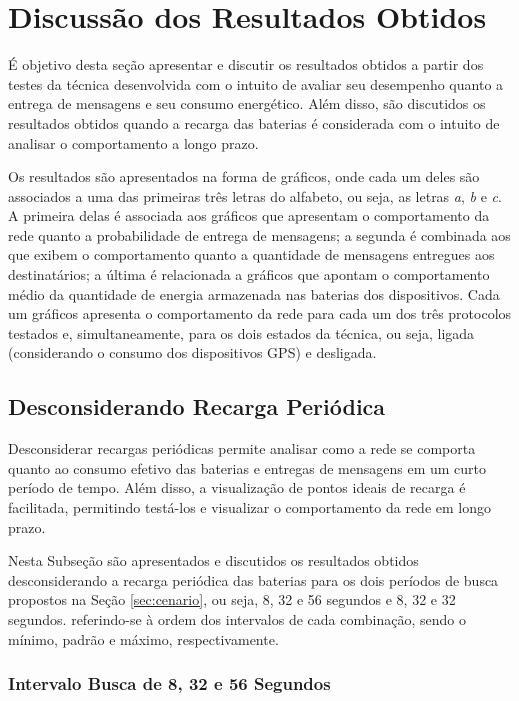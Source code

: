 \section{Discussão dos Resultados Obtidos}

É objetivo desta seção apresentar e discutir os resultados obtidos a partir dos testes da técnica desenvolvida com o intuito de avaliar seu desempenho quanto a entrega de mensagens e seu consumo energético. Além disso, são discutidos os resultados obtidos quando a recarga das baterias é considerada com o intuito de analisar o comportamento a longo prazo.

Os resultados são apresentados na forma de gráficos, onde cada um deles são associados a uma das primeiras três letras do alfabeto, ou seja, as letras \emph{a}, \emph{b} e \emph{c}. A primeira delas é associada aos gráficos que apresentam o comportamento da rede quanto a probabilidade de entrega de mensagens; a segunda é combinada aos que exibem o comportamento quanto a quantidade de mensagens entregues aos destinatários; a última é relacionada a gráficos que apontam o comportamento médio da quantidade de energia armazenada nas baterias dos dispositivos. Cada um gráficos apresenta o comportamento da rede para cada um dos três protocolos testados e, simultaneamente, para os dois estados da técnica, ou seja, ligada (considerando o consumo dos dispositivos GPS) e desligada. 

\subsection{Desconsiderando Recarga Periódica}

Desconsiderar recargas periódicas permite analisar como a rede se comporta quanto ao consumo efetivo das baterias e entregas de mensagens em um curto período de tempo. Além disso, a visualização de pontos ideais de recarga é facilitada, permitindo testá-los e visualizar o comportamento da rede em longo prazo.

Nesta Subseção são apresentados e discutidos os resultados obtidos desconsiderando a recarga periódica das baterias para os dois períodos de busca propostos na Seção \ref{sec:cenario}, ou seja, 8, 32 e 56 segundos e 8, 32 e 32 segundos. referindo-se à ordem dos intervalos de cada combinação, sendo o mínimo, padrão e máximo, respectivamente.

\newpage
\subsubsection{Intervalo Busca de 8, 32 e 56 Segundos}
\label{8-32-56_semRecarga}

